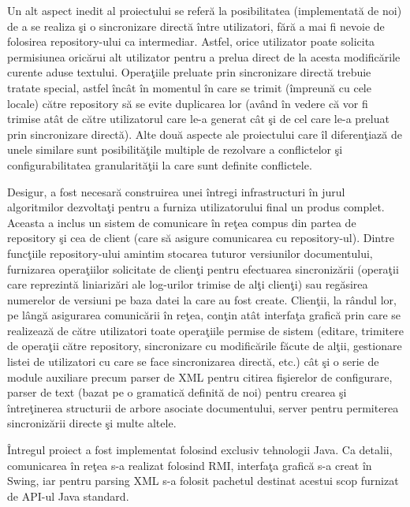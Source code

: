 \documentclass[a4paper]{article}
\begin{document}
Un alt aspect inedit al proiectului se refer\u a la posibilitatea (implementat\u a
de noi) de a se realiza \c si o sincronizare direct\u a \^ intre utilizatori, f\u ar\u a
a mai fi nevoie de folosirea repository-ului ca intermediar. Astfel, orice utilizator
poate solicita permisiunea oric\u arui alt utilizator pentru a prelua direct de la acesta
modific\u arile curente aduse textului. Opera\c tiile preluate prin sincronizare direct\u a
trebuie tratate special, astfel \^ inc\^ at \^ in momentul \^ in care se trimit
(\^ impreun\u a cu cele locale) c\u atre repository s\u a se evite duplicarea lor
(av\^ and \^ in vedere c\u a vor fi trimise at\^ at de c\u atre utilizatorul care le-a
generat c\^ at \c si de cel care le-a preluat prin sincronizare direct\u a). Alte dou\u a
aspecte ale proiectului care \^ il diferen\c tiaz\u a de unele similare sunt posibilit\u a\c tile
multiple de rezolvare a conflictelor \c si configurabilitatea granularit\u a\c tii la
care sunt definite conflictele.

Desigur, a fost necesar\u a construirea unei \^ intregi infrastructuri \^ in jurul
algoritmilor dezvolta\c ti pentru a furniza utilizatorului final un produs complet. Aceasta
a inclus un sistem de comunicare \^ in re\c tea compus din partea de repository \c si
cea de client (care s\u a asigure comunicarea cu repository-ul). Dintre func\c tiile
repository-ului amintim stocarea tuturor versiunilor documentului, furnizarea
opera\c tiilor solicitate de clien\c ti pentru efectuarea sincroniz\u arii
(opera\c tii care reprezint\u a liniariz\u ari ale log-urilor trimise de al\c ti
clien\c ti) sau reg\u asirea numerelor de versiuni pe baza datei la care au fost
create. Clien\c tii, la r\^ andul lor, pe l\^ ang\u a asigurarea comunic\u arii
\^ in re\c tea, con\c tin at\^ at interfa\c ta grafic\u a prin care se re\-a\-li\-zea\-z\u a
de c\u atre utilizatori toate opera\c tiile permise de sistem (editare, trimitere
de opera\c tii c\u atre repository, sincronizare cu modific\u arile f\u acute de
al\c tii, gestionare listei de utilizatori cu care se face sincronizarea direct\u a,
etc.) c\^ at \c si o serie de module auxiliare precum parser de XML pentru citirea
fi\c sierelor de con\-fi\-gu\-ra\-re, parser de text (bazat pe o gramatic\u a definit\u a de
noi) pentru crearea \c si \^ intre\c tinerea structurii de arbore asociate documentului,
server pentru permiterea sincroniz\u arii directe \c si multe altele.

\^ Intregul proiect a fost implementat folosind exclusiv tehnologii Java. Ca detalii,
comunicarea \^ in re\c tea s-a realizat folosind RMI, interfa\c ta grafic\u a s-a
creat \^ in Swing, iar pentru parsing XML s-a folosit pachetul destinat acestui
scop furnizat de API-ul Java standard.
\end{document}

